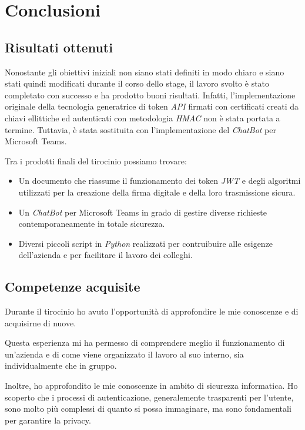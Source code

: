 \chapter{Conclusioni}
\label{cap:conclusioni}

\section{Risultati ottenuti}

Nonostante gli obiettivi iniziali non siano stati definiti in modo chiaro e siano stati quindi modificati durante il corso dello stage, il lavoro svolto è stato completato con successo e ha prodotto buoni risultati.
Infatti, l'implementazione originale della tecnologia generatrice di token \emph{API} firmati con certificati creati da chiavi ellittiche ed autenticati con metodologia \emph{HMAC} non è stata portata a termine.
Tuttavia, è stata sostituita con l'implementazione del \emph{ChatBot} per Microsoft Teams.

\noindent Tra i prodotti finali del tirocinio possiamo trovare:
\begin{itemize}
	\item Un documento che riassume il funzionamento dei token \emph{JWT} e degli algoritmi utilizzati per la creazione della firma digitale e della loro trasmissione sicura.
	\item Un \emph{ChatBot} per Microsoft Teams in grado di gestire diverse richieste contemporaneamente in totale sicurezza.
	\item Diversi piccoli script in \emph{Python} realizzati per contruibuire alle esigenze dell'azienda e per facilitare il lavoro dei colleghi.
\end{itemize}

\section{Competenze acquisite}

Durante il tirocinio ho avuto l'opportunità di approfondire le mie conoscenze e di acquisirne di nuove.

Questa esperienza mi ha permesso di comprendere meglio il funzionamento di un'azienda e di come viene organizzato il lavoro al suo interno, sia individualmente che in gruppo.

Inoltre, ho approfondito le mie conoscenze in ambito di sicurezza informatica.
Ho scoperto che i processi di autenticazione, generalemente trasparenti per l'utente, sono molto più complessi di quanto si possa immaginare, ma sono fondamentali per garantire la privacy.


